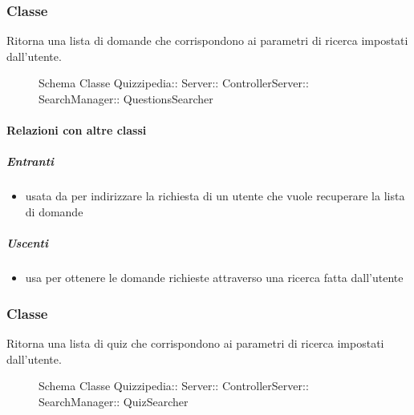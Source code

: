 \subsubsection{Classe }
Ritorna una lista di domande che corrispondono ai parametri di ricerca impostati dall'utente.
\begin{figure}[H]
\centering
\noindent{}
\caption[Schema Classe QuestionsSearcher]{Schema Classe Quizzipedia:: Server:: ControllerServer:: SearchManager:: QuestionsSearcher}
\end{figure}
\paragraph{Relazioni con altre classi}
\subparagraph{Entranti}
\begin{itemize}
\item usata da  per indirizzare la richiesta di un utente che vuole recuperare la lista di domande
\end{itemize}
\subparagraph{Uscenti}
\begin{itemize}
\item usa  per ottenere le domande richieste attraverso una ricerca fatta dall'utente
\end{itemize}
\subsubsection{Classe }
Ritorna una lista di quiz che corrispondono ai parametri di ricerca impostati dall'utente.
\begin{figure}[H]
\centering
\noindent{}
\caption[Schema Classe QuizSearcher]{Schema Classe Quizzipedia:: Server:: ControllerServer:: SearchManager:: QuizSearcher}
\end{figure}
